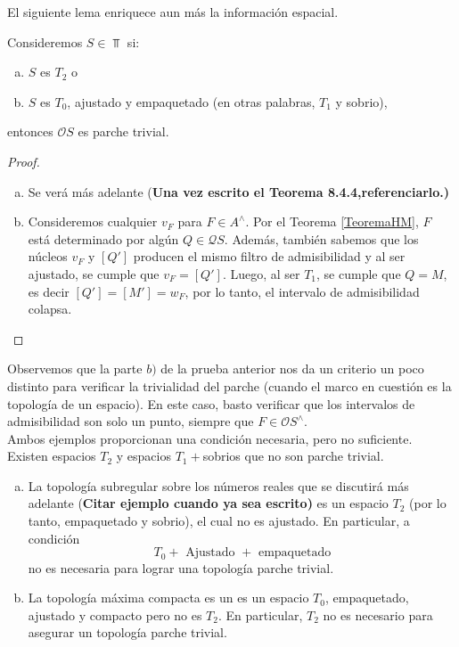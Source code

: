 El siguiente lema enriquece aun más la información espacial.

\begin{lem}\label{Lema8.1.4}
    Consideremos $S\in \Top$ si:
    \begin{enumerate}[a)]
        \item $S$ es $T_2$ o
        \item $S$ es $T_0$, ajustado y empaquetado (en otras palabras, $T_1$ y sobrio),
    \end{enumerate}
    entonces $\mathcal{O}S$ es parche trivial.
\end{lem}

\begin{proof}
    \begin{enumerate}[a)]
        \item Se verá más adelante (\textbf{Una vez escrito el Teorema 8.4.4,referenciarlo.)}
        \item Consideremos cualquier $v_F$ para $F\in A^\wedge$. Por el Teorema \ref{TeoremaHM}, $F$ está determinado por algún $Q\in \mathcal{Q}S$. Además, también sabemos que los núcleos $v_F$ y $[Q']$ producen el mismo filtro de admisibilidad y al ser ajustado, se cumple que $v_F=[Q']$. Luego, al ser $T_1$, se cumple que $Q=M$, es decir $[Q']=[M']=w_F$, por lo tanto, el intervalo de admisibilidad colapsa.
    \end{enumerate}
\end{proof}

Observemos que la parte $b)$ de la prueba anterior nos da un criterio un poco distinto para verificar la trivialidad del parche (cuando el marco en cuestión es la topología de un espacio). En este caso, basto verificar que los intervalos de admisibilidad son solo un punto, siempre que $F\in \mathcal{O}S^\wedge$. \\

Ambos ejemplos proporcionan una condición necesaria, pero no suficiente. Existen espacios $T_2$ y espacios $T_1+$sobrios que no son parche trivial.



\begin{ej}\label{Ejemplo8.1.5}
    \begin{enumerate}[a)]
        \item La topología subregular sobre los números reales que se discutirá más adelante (\textbf{Citar ejemplo cuando ya sea escrito)} es un espacio $T_2$ (por lo tanto, empaquetado y sobrio), el cual no es ajustado. En particular, a condición
        \[
        T_0+\mbox{ Ajustado }+ \mbox{ empaquetado}
        \]
        no es necesaria para lograr una topología parche trivial.

        \item La topología máxima compacta es un es un espacio $T_0$, empaquetado, ajustado y compacto pero no es $T_2$. En particular, $T_2$ no es necesario para asegurar un topología parche trivial.
    \end{enumerate}
\end{ej}

